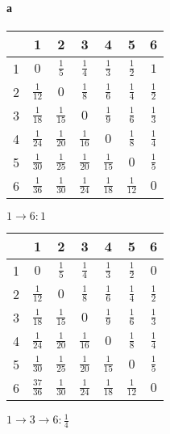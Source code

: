\documentclass[russian]{article}
\begin{document}
\paragraph*{а}

\begin{tabular}{|c|c|c|c|c|c|c|}\hline
& 1& 2& 3& 4& 5& 6\\\hline
1& $0$& $\frac{1}{5}$& $\frac{1}{4}$& $\frac{1}{3}$& $\frac{1}{2}$& $1$\\\hline
2& $\frac{1}{12}$& $0$& $\frac{1}{8}$& $\frac{1}{6}$& $\frac{1}{4}$& $\frac{1}{2}$\\\hline
3& $\frac{1}{18}$& $\frac{1}{15}$& $0$& $\frac{1}{9}$& $\frac{1}{6}$& $\frac{1}{3}$\\\hline
4& $\frac{1}{24}$& $\frac{1}{20}$& $\frac{1}{16}$& $0$& $\frac{1}{8}$& $\frac{1}{4}$\\\hline
5& $\frac{1}{30}$& $\frac{1}{25}$& $\frac{1}{20}$& $\frac{1}{15}$& $0$& $\frac{1}{5}$\\\hline
6& $\frac{1}{36}$& $\frac{1}{30}$& $\frac{1}{24}$& $\frac{1}{18}$& $\frac{1}{12}$& $0$\\\hline
\end{tabular}

$ 1 \to 6 : 1$

\begin{tabular}{|c|c|c|c|c|c|c|}\hline
& 1& 2& 3& 4& 5& 6\\\hline
1& $0$& $\frac{1}{5}$& $\frac{1}{4}$& $\frac{1}{3}$& $\frac{1}{2}$& $0$\\\hline
2& $\frac{1}{12}$& $0$& $\frac{1}{8}$& $\frac{1}{6}$& $\frac{1}{4}$& $\frac{1}{2}$\\\hline
3& $\frac{1}{18}$& $\frac{1}{15}$& $0$& $\frac{1}{9}$& $\frac{1}{6}$& $\frac{1}{3}$\\\hline
4& $\frac{1}{24}$& $\frac{1}{20}$& $\frac{1}{16}$& $0$& $\frac{1}{8}$& $\frac{1}{4}$\\\hline
5& $\frac{1}{30}$& $\frac{1}{25}$& $\frac{1}{20}$& $\frac{1}{15}$& $0$& $\frac{1}{5}$\\\hline
6& $\frac{37}{36}$& $\frac{1}{30}$& $\frac{1}{24}$& $\frac{1}{18}$& $\frac{1}{12}$& $0$\\\hline
\end{tabular}

$ 1 \to 3 \to 6 : \frac{1}{4}$
\end{document}
